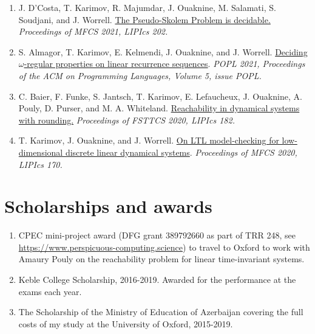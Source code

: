 \documentclass{article}
\begin{document}
\begin{enumerate}
		\item J. D'Costa, T. Karimov, R. Majumdar, J. Ouaknine, M. Salamati, S. Soudjani, and J. Worrell.
		\newline \href{https://people.mpi-sws.org/~joel/publications/pseudo-skolem21abs.html}{The Pseudo-Skolem Problem is decidable.}
		\newline \emph{Proceedings of MFCS 2021, LIPIcs 202.}
		
		\item S. Almagor, T. Karimov, E. Kelmendi, J. Ouaknine, and J. Worrell.
		\newline \href{https://people.mpi-sws.org/~joel/publications/omega_LRS21abs.html}{Deciding $\omega$-regular properties on linear recurrence sequences}. 
		\newline
		\emph{POPL 2021, Proceedings of the ACM on Programming Languages, Volume 5, issue POPL.}
		
		\item C. Baier, F. Funke, S. Jantsch, T. Karimov, E. Lefaucheux, J. Ouaknine,
		A. Pouly, D. Purser, and M. A. Whiteland. 
		\newline
		\href{https://people.mpi-sws.org/~joel/publications/dynamical_systems_orbit_rounding20abs.html}{Reachability in dynamical systems with rounding.} 
		\newline \emph{Proceedings of FSTTCS 2020, LIPIcs 182.}
		
		\item T. Karimov, J. Ouaknine, and J. Worrell. 
		\newline \href{https://people.mpi-sws.org/~joel/publications/LTL_discrete_LDS20abs.html}{On LTL model-checking for low-dimensional discrete
		linear dynamical systems}. \newline \emph{Proceedings of MFCS 2020, LIPIcs 170.}
	\end{enumerate}

	\section*{Scholarships and awards}
	\begin{enumerate}
		\item CPEC mini-project award (DFG grant 389792660 as part of TRR 248, see \href{https://www.perspicuous-computing.science/}{https://www.perspicuous-computing.science}) to travel to Oxford to work with Amaury Pouly on the reachability problem for linear time-invariant systems.
		\item Keble College Scholarship, 2016-2019. Awarded for the performance at the exams each year.
		\item The Scholarship of the Ministry of Education of Azerbaijan covering the full costs of my study at the University of Oxford, 2015-2019.
	\end{enumerate}
	
\end{document}

